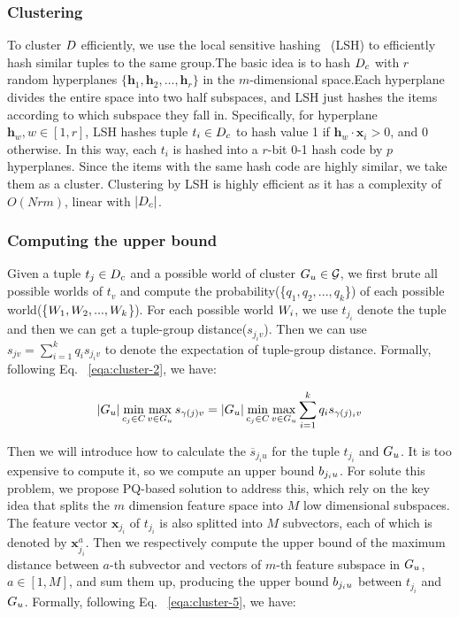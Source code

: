 \subsubsection{Clustering}
\label{subsec:clustering}
To cluster $D$ efficiently,  we use the local sensitive hashing~\cite{} (LSH) to efficiently hash similar tuples to the same group.The basic idea  is to hash $D_c$ with $r$ random hyperplanes $\{\mathbf{h}_1, \mathbf{h}_2, \dots, \mathbf{h}_r\}$ in the  $m$-dimensional space.Each hyperplane divides the entire space into two half subspaces, and LSH just hashes the  items according to which subspace they fall in. Specifically, for  hyperplane $\mathbf{h}_w, w\in[1,r]$, LSH hashes tuple $t_i\in D_c$ to hash value 1 if $\mathbf{h}_w \cdot \mathbf{x}_i> 0$, and 0 otherwise.
In this way, each $t_i$ is hashed into a $r$-bit 0-1 hash code by $p$ hyperplanes.
Since the items with the same hash code are highly similar, we take them as a cluster.
Clustering by LSH is highly efficient as it has a complexity of  $O(Nrm)$, linear with $|D_c|$. 

\subsubsection{Computing the upper bound}

Given a tuple $t_j\in D_c$ and a possible world of cluster $G_u \in \mathcal{G}$, we first brute all possible worlds of $t_v$ and compute the probability(\ie \{$q_1, q_2, ..., q_k$\}) of each possible world(\ie \{$W_1, W_2, ..., W_k$\}). For each possible world $W_i$, we use $t_{j_i}$ denote the tuple and then we can get a tuple-group distance(\ie $s_{j_iv}$). Then we can use $s_{jv} = \sum_{i=1}^k q_i s_{j_iv}$ to denote the expectation of tuple-group distance. Formally, following Eq. ~\ref{eqa:cluster-2}, we have:

\begin{equation}\label{eqa:cluster-5}
    \begin{aligned}
        |G_u|  \min_{c_j\in C} \max_{v \in G_u}s_{\gamma(j)v} = |G_u|  \min_{c_j\in C} \max_{v \in G_u} \sum_{i = 1}^{k} q_i s_{\gamma(j)_iv}
    \end{aligned}
\end{equation}


Then we will introduce how to calculate the $\overline{s}_{j_iu}$ for the tuple $t_{j_i}$ and $G_u$. It is too expensive to compute it, so we compute an upper bound $b_{j_iu}$. For solute this problem, we propose PQ-based solution to address this, which rely on the key idea that splits the $m$ dimension feature space into $M$ low dimensional subspaces. The feature vector $\mathbf{x}_{j_i}$ of $t_{j_i}$ is also splitted into $M$ subvectors, each of which is denoted by $\mathbf{x}^a_{j_i}$. Then we respectively compute the upper bound of the maximum distance between $a$-th subvector and vectors of $m$-th feature subspace in $G_u$, $a\in [1,M]$, and sum them up, producing the upper bound $b_{j_iu}$ between $t_{j_i}$ and $G_u$. Formally, following Eq. ~\ref{eqa:cluster-5}, we have:

